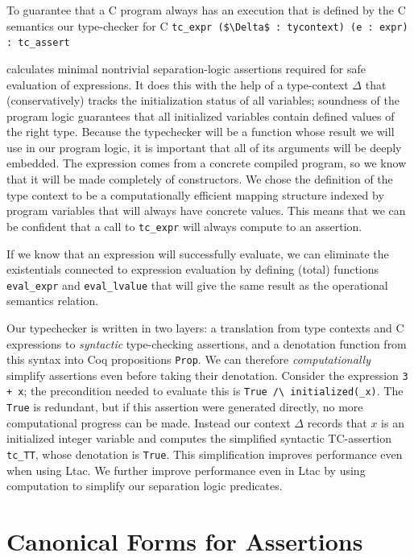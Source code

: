\documentclass{puthesis}
\begin{document}
To guarantee that a C program always has an execution that is defined
by the C semantics our type-checker for C \cite[Chapter
25]{appel14:plcc} \lstinline|tc_expr ($\Delta$ : tycontext) (e : expr) : tc_assert|

 calculates minimal nontrivial separation-logic
assertions required for safe evaluation of expressions.  It does this
with the help of a type-context $\Delta$ that (conservatively) tracks the
initialization status of all variables; soundness of the program logic
guarantees that all initialized variables contain defined values of
the right type. Because the typechecker will be a function whose
result we will use in our program logic, it is important that all of
its arguments will be deeply embedded. The expression comes from a
concrete compiled program, so we know that it will be made completely
of constructors. We chose the definition of the type context to be a
computationally efficient mapping structure indexed by program
variables that will always have concrete values. This means that we
can be confident that a call to \lstinline|tc_expr| will always compute
to an assertion.


If we know that an expression will successfully evaluate, we can
eliminate the existentials connected to expression evaluation by
defining (total) functions \lstinline|eval_expr| and
\lstinline|eval_lvalue| that will give the same result as the
operational semantics relation.

Our typechecker is written in two layers: a translation from type
contexts and C expressions to \emph{syntactic} type-checking
assertions, and a denotation function from this syntax into Coq
propositions \lstinline|Prop|.  We can therefore
\emph{computationally} simplify assertions even before taking their
denotation.  Consider the expression \lstinline{3 + x}; the
precondition needed to evaluate this is 
\lstinline|True /\ initialized(_x)|. The \lstinline|True| is redundant, but if this
assertion were generated directly, no more computational progress can
be made. Instead our context $\Delta$ records that $x$ is an
initialized integer variable and computes the simplified syntactic
TC-assertion \lstinline|tc_TT|, whose denotation is \lstinline|True|.
This simplification improves performance even when using Ltac. We
further improve performance even in Ltac by using computation to
simplify our separation logic predicates.


\chapter{Canonical Forms for Assertions}
\end{document}
